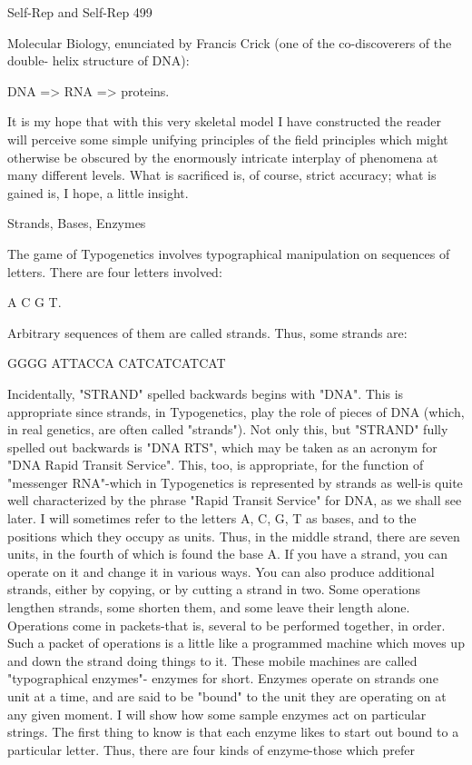 {Self-Rep and Self-Rep                                                                            499

Molecular Biology, enunciated by Francis Crick (one of the co-discoverers of the double-
helix structure of DNA):

                                DNA => RNA => proteins.

It is my hope that with this very skeletal model I have constructed the reader will perceive
some simple unifying principles of the field principles which might otherwise be obscured by
the enormously intricate interplay of phenomena at many different levels. What is sacrificed
is, of course, strict accuracy; what is gained is, I hope, a little insight.

                                  Strands, Bases, Enzymes

The game of Typogenetics involves typographical manipulation on sequences of letters.
There are four letters involved:

                                          A C G T.

Arbitrary sequences of them are called strands. Thus, some strands are:

                                        GGGG
                                      ATTACCA
                                    CATCATCATCAT

Incidentally, "STRAND" spelled backwards begins with "DNA". This is appropriate since
strands, in Typogenetics, play the role of pieces of DNA (which, in real genetics, are often
called "strands"). Not only this, but "STRAND" fully spelled out backwards is "DNA RTS",
which may be taken as an acronym for "DNA Rapid Transit Service". This, too, is
appropriate, for the function of "messenger RNA"-which in Typogenetics is represented by
strands as well-is quite well characterized by the phrase "Rapid Transit Service" for DNA, as
we shall see later.
        I will sometimes refer to the letters A, C, G, T as bases, and to the positions which
they occupy as units. Thus, in the middle strand, there are seven units, in the fourth of which
is found the base A.
        If you have a strand, you can operate on it and change it in various ways. You can
also produce additional strands, either by copying, or by cutting a strand in two. Some
operations lengthen strands, some shorten them, and some leave their length alone.
        Operations come in packets-that is, several to be performed together, in order. Such a
packet of operations is a little like a programmed machine which moves up and down the
strand doing things to it. These mobile machines are called "typographical enzymes"-
enzymes for short. Enzymes operate on strands one unit at a time, and are said to be "bound"
to the unit they are operating on at any given moment.
        I will show how some sample enzymes act on particular strings. The first thing to
know is that each enzyme likes to start out bound to a particular letter. Thus, there are four
kinds of enzyme-those which prefer




}
